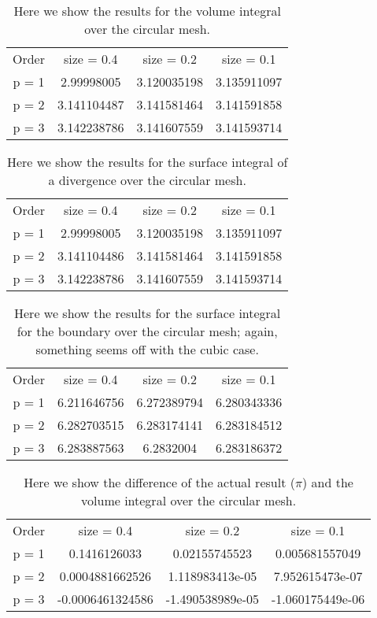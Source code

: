 \begin{table}
\caption{Here we show the results for the volume integral over the circular mesh.}
\centering\begin{tabular}{c | c c c}

Order & size = 0.4 & size = 0.2 & size = 0.1 \\
p = 1 & 2.99998005 & 3.120035198 & 3.135911097 \\
p = 2 & 3.141104487 & 3.141581464 & 3.141591858 \\
p = 3 & 3.142238786 & 3.141607559 & 3.141593714 \\
\end{tabular}
\label{tbl:area1}
\end{table}

\begin{table}
\caption{Here we show the results for the surface integral of a divergence over the circular mesh.}
\centering\begin{tabular}{c | c c c}

Order & size = 0.4 & size = 0.2 & size = 0.1 \\
p = 1 & 2.99998005 & 3.120035198 & 3.135911097 \\
p = 2 & 3.141104486 & 3.141581464 & 3.141591858 \\
p = 3 & 3.142238786 & 3.141607559 & 3.141593714 \\
\end{tabular}
\label{tbl:area2}
\end{table}

\begin{table}
\caption{Here we show the results for the surface integral for the boundary over the circular mesh; again, something seems off with the cubic case.}
\centering\begin{tabular}{c | c c c}

Order & size = 0.4 & size = 0.2 & size = 0.1 \\
p = 1 & 6.211646756 & 6.272389794 & 6.280343336 \\
p = 2 & 6.282703515 & 6.283174141 & 6.283184512 \\
p = 3 & 6.283887563 &  6.2832004 & 6.283186372 \\
\end{tabular}
\label{tbl:perimeter}
\end{table}

\begin{table}
\caption{Here we show the difference of the actual result ($\pi$) and the volume integral over the circular mesh.}
\centering\begin{tabular}{c | c c c}

Order & size = 0.4 & size = 0.2 & size = 0.1 \\
p = 1 & 0.1416126033 & 0.02155745523 & 0.005681557049 \\
p = 2 & 0.0004881662526 & 1.118983413e-05 & 7.952615473e-07 \\
p = 3 & -0.0006461324586 & -1.490538989e-05 & -1.060175449e-06 \\
\end{tabular}
\label{tbl:diffarea1}
\end{table}

